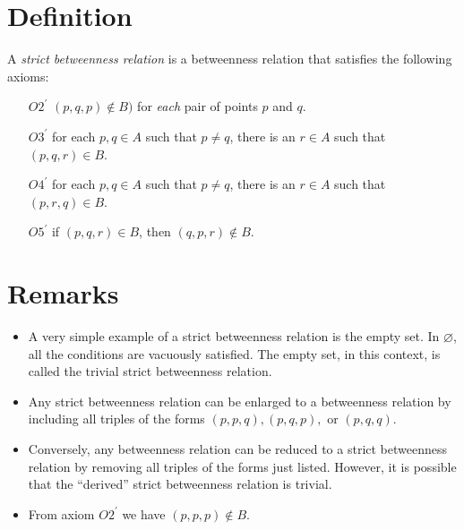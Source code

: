 \documentclass[12pt]{article}
\begin{document}
\section{Definition} A \emph{strict betweenness relation} is a betweenness relation that satisfies 
the following axioms:
\begin{itemize}
\item[$O2^{\prime}$] $(p,q,p)\notin B)$ for \emph{each} pair of points $p$ and $q$. 
\item[$O3^{\prime}$] for each $p,q\in A$ such that $p\ne q$, there is an $r\in A$ such that $(p,q,r)\in B$.
\item[$O4^{\prime}$] for each $p,q\in A$ such that $p\ne q$, there is an $r\in A$ such that $(p,r,q)\in B$.
\item[$O5^{\prime}$] if $(p,q,r)\in B$, then $(q,p,r)\notin B$.
\end{itemize}
\section{Remarks}
\begin{itemize}
\item A very simple  example of a strict betweenness relation is the empty set.  
In $\varnothing$, all the conditions  are vacuously satisfied.  
The empty set, in this context, is called the trivial strict betweenness relation.
\item Any strict betweenness relation can be enlarged to a betweenness
relation by including all triples of the forms $(p,p,q),(p,q,p),$ or
$(p,q,q)$.
\item Conversely, any betweenness relation can be reduced
to a strict betweenness relation by removing all triples of the
forms just listed.  However, it is possible that the ``derived''
strict betweenness relation is trivial.
\item From axiom $O2^{\prime}$ we have $(p,p,p) \notin B.$
\end{itemize}
\end{document}
